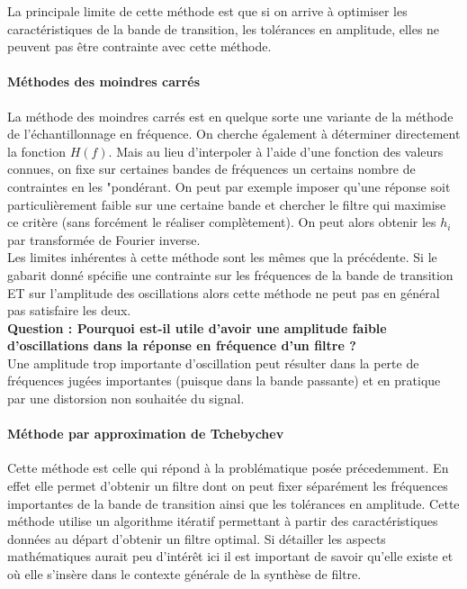 \documentclass[11pt,a4paper]{article}
\begin{document}
La principale limite de cette méthode est que si on arrive à optimiser les caractéristiques de la bande de transition, les tolérances en amplitude, elles ne peuvent pas être contrainte avec cette méthode.\\

\paragraph{Méthodes des moindres carrés}
La méthode des moindres carrés est en quelque sorte une variante de la méthode de l'échantillonnage en fréquence. On cherche également à déterminer directement la fonction $H(f)$. Mais au lieu d'interpoler à l'aide d'une fonction des valeurs connues, on fixe sur certaines bandes de fréquences un certains nombre de contraintes en les "pondérant. On peut par exemple imposer qu'une réponse soit particulièrement faible sur une certaine bande et chercher le filtre qui maximise ce critère (sans forcément le réaliser complètement). On peut alors obtenir les $h_i$ par transformée de Fourier inverse.\\

Les limites inhérentes à cette méthode sont les mêmes que la précédente. Si le gabarit donné spécifie une contrainte sur les fréquences de la bande de transition ET sur l'amplitude des oscillations alors cette méthode ne peut pas en général pas satisfaire les deux.\\

\textbf{Question : Pourquoi est-il utile d'avoir une amplitude faible d'oscillations dans la réponse en fréquence d'un filtre ?}\\

Une amplitude trop importante d'oscillation peut résulter dans la perte de fréquences jugées importantes (puisque dans la bande passante) et en pratique par une distorsion non souhaitée du signal.\\

\paragraph{Méthode par approximation de Tchebychev}
Cette méthode est celle qui répond à la problématique posée précedemment. En effet elle permet d'obtenir un filtre dont on peut fixer séparément les fréquences importantes de la bande de transition ainsi que les tolérances en amplitude. Cette méthode utilise un algorithme itératif permettant à partir des caractéristiques données au départ d'obtenir un filtre optimal. Si détailler les aspects mathématiques aurait peu d'intérêt ici il est important de savoir qu'elle existe et où elle s'insère dans le contexte générale de la synthèse de filtre.\\
\end{document}

